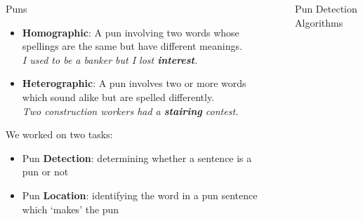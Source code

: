 \documentclass[final]{beamer}
\newlength{\sepwid}
\newlength{\onecolwid}
\newlength{\twocolwid}
\begin{document}
\begin{frame}[t]
\begin{columns}[t]
\begin{column}{\onecolwid}
\begin{block}{Puns}
{					\begin{itemize}
						\item {\textbf{Homographic}: A pun involving two words whose spellings are the same but have different meanings.\\
								\textit{I used to be a banker but I lost \textbf{interest}.}}
						\item {\textbf{Heterographic}: A pun involves two or more words which sound alike but are spelled differently.\\
								\textit{Two construction workers had a \textbf{stairing} contest.}}
					\end{itemize}
					\vspace{40mm}
					We worked on two tasks: 
					\begin{itemize}
						\item {Pun \textbf{Detection}: determining whether a sentence is a pun or not}
						\item {Pun \textbf{Location}: identifying the word in a pun sentence which `makes' the pun}
					\end{itemize}
				}
			\end{block}
		\end{column}
		\begin{column}{\sepwid}\end{column} %
		\begin{column}{\twocolwid}
			\begin{columns}[t,totalwidth=\twocolwid] %
				\begin{column}{\onecolwid}\vspace{-.6in}
					\vspace{60mm}
					\begin{block}{Pun Detection Algorithms}
						{\large 
							\begin{itemize}

\end{itemize}}
\end{block}
\end{column}
\end{columns}
\end{column}
\end{columns}
\end{frame}
\end{document}
